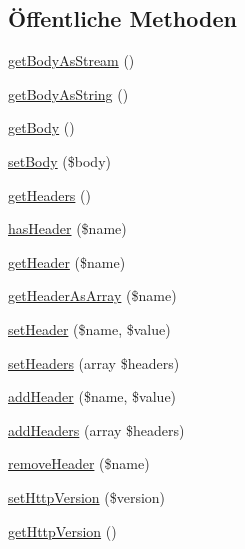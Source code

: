 \subsection*{Öffentliche Methoden}
\begin{DoxyCompactItemize}
\item 
\mbox{\hyperlink{interface_sabre_1_1_h_t_t_p_1_1_message_interface_a8f6211306846a4789498647c03d02442}{get\+Body\+As\+Stream}} ()
\item 
\mbox{\hyperlink{interface_sabre_1_1_h_t_t_p_1_1_message_interface_a2e5fd4e2e19115840ba859a096666d9d}{get\+Body\+As\+String}} ()
\item 
\mbox{\hyperlink{interface_sabre_1_1_h_t_t_p_1_1_message_interface_a0738667a55e423f8510c84035b99f73d}{get\+Body}} ()
\item 
\mbox{\hyperlink{interface_sabre_1_1_h_t_t_p_1_1_message_interface_a9bda348f19928cf4972ba2835d0be73c}{set\+Body}} (\$body)
\item 
\mbox{\hyperlink{interface_sabre_1_1_h_t_t_p_1_1_message_interface_af4af3d2f6712193eec05494ad2b014ab}{get\+Headers}} ()
\item 
\mbox{\hyperlink{interface_sabre_1_1_h_t_t_p_1_1_message_interface_ac2cb6b88f6fc6cf05a2d751dc555ec0d}{has\+Header}} (\$name)
\item 
\mbox{\hyperlink{interface_sabre_1_1_h_t_t_p_1_1_message_interface_ac83dfeddea2be33e620b32b07ae057c5}{get\+Header}} (\$name)
\item 
\mbox{\hyperlink{interface_sabre_1_1_h_t_t_p_1_1_message_interface_ab39e08a0f6abaa7540e0ea7e056760b3}{get\+Header\+As\+Array}} (\$name)
\item 
\mbox{\hyperlink{interface_sabre_1_1_h_t_t_p_1_1_message_interface_aa9ddcda903d1c71710cc1bcc0b415b9c}{set\+Header}} (\$name, \$value)
\item 
\mbox{\hyperlink{interface_sabre_1_1_h_t_t_p_1_1_message_interface_afd622b82029b37f47af76f83b17ba12f}{set\+Headers}} (array \$headers)
\item 
\mbox{\hyperlink{interface_sabre_1_1_h_t_t_p_1_1_message_interface_ab64fcf12f65ca467a36b0f00961dd06b}{add\+Header}} (\$name, \$value)
\item 
\mbox{\hyperlink{interface_sabre_1_1_h_t_t_p_1_1_message_interface_a1c33f24f28689265b5c436939cc898b1}{add\+Headers}} (array \$headers)
\item 
\mbox{\hyperlink{interface_sabre_1_1_h_t_t_p_1_1_message_interface_a8753c1a48f9b80b341983bc414fbd85d}{remove\+Header}} (\$name)
\item 
\mbox{\hyperlink{interface_sabre_1_1_h_t_t_p_1_1_message_interface_a3b078aad665c00c171bc2a9b7ac05d6d}{set\+Http\+Version}} (\$version)
\item 
\mbox{\hyperlink{interface_sabre_1_1_h_t_t_p_1_1_message_interface_a0dd9057fca16d4947ecdbe6bc425caff}{get\+Http\+Version}} ()
\end{DoxyCompactItemize}


